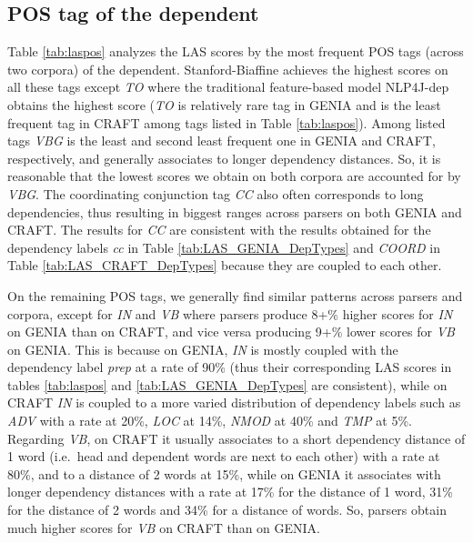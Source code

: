\documentclass[twocolumn,hyperref]{bmcart}\pdfoutput=1
\begin{document}
\subsection*{POS tag of the dependent}

Table \ref{tab:laspos} analyzes the LAS scores by the most frequent POS tags (across two corpora) of the dependent. Stanford-Biaffine achieves the highest scores on all these tags except \textit{TO} where the traditional feature-based model NLP4J-dep obtains the highest score (\textit{TO} is relatively rare tag in GENIA and is the least frequent tag in CRAFT among  tags listed in Table \ref{tab:laspos}). Among listed tags \textit{VBG} is the least and second least frequent one in GENIA and CRAFT, respectively, and generally associates to longer dependency distances. So, it is reasonable that the lowest scores we obtain on both corpora are accounted for by \textit{VBG}. The coordinating conjunction tag \textit{CC} also often corresponds to long  dependencies,  thus resulting in biggest ranges across parsers on both GENIA and CRAFT. The results for \textit{CC}  are
consistent with the results obtained for the dependency labels  \textit{cc} in 
 Table \ref{tab:LAS_GENIA_DepTypes} and   \textit{COORD}  in Table  \ref{tab:LAS_CRAFT_DepTypes} because they are coupled to each other. 
 
 
On the remaining POS tags, we generally find similar patterns across parsers and corpora, except for  \textit{IN} and \textit{VB} where  parsers produce 8+\% higher scores for \textit{IN} on GENIA than on CRAFT, and vice versa producing 9+\% lower scores for \textit{VB} on GENIA.  
This is because on GENIA,   \textit{IN} is  mostly coupled with the dependency label \textit{prep} at a rate  of 90\%  (thus their corresponding LAS  scores in tables \ref{tab:laspos}   and \ref{tab:LAS_GENIA_DepTypes} are consistent), while on CRAFT \textit{IN} is  coupled to a more varied distribution of dependency labels such as \textit{ADV} with a  rate at 20\%, \textit{LOC} at 14\%, \textit{NMOD} at 40\% and \textit{TMP} at 5\%.  Regarding \textit{VB},  on CRAFT it usually associates to a short dependency distance of 1 word (i.e.\ head and dependent words are next to each other) with a rate at 80\%, and to a distance of 2 words at  15\%, while on GENIA it associates with longer dependency distances with a rate at 17\% for the distance of 1 word, 31\% for the distance of 2 words and 34\% for a distance of  words. So, parsers obtain much higher scores for \textit{VB} on CRAFT than on GENIA.  
\end{document}
